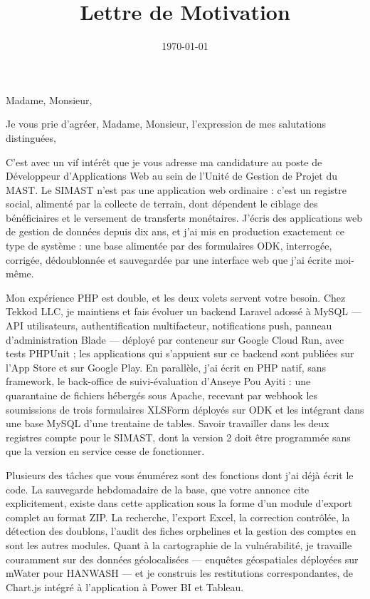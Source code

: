 \documentclass[10pt,a4paper,sans]{moderncv}
\title{Lettre de Motivation}
\begin{document}
\date{\today}
\opening{Madame, Monsieur,}
\closing{Je vous prie d'agréer, Madame, Monsieur, l'expression de mes salutations distinguées,}

\makelettertitle

C'est avec un vif intérêt que je vous adresse ma candidature au poste de Développeur d'Applications Web au sein de l'Unité de Gestion de Projet du MAST. Le SIMAST n'est pas une application web ordinaire : c'est un registre social, alimenté par la collecte de terrain, dont dépendent le ciblage des bénéficiaires et le versement de transferts monétaires. J'écris des applications web de gestion de données depuis dix ans, et j'ai mis en production exactement ce type de système : une base alimentée par des formulaires ODK, interrogée, corrigée, dédoublonnée et sauvegardée par une interface web que j'ai écrite moi-même.

Mon expérience PHP est double, et les deux volets servent votre besoin. Chez Tekkod LLC, je maintiens et fais évoluer un backend Laravel adossé à MySQL --- API utilisateurs, authentification multifacteur, notifications push, panneau d'administration Blade --- déployé par conteneur sur Google Cloud Run, avec tests PHPUnit ; les applications qui s'appuient sur ce backend sont publiées sur l'App Store et sur Google Play. En parallèle, j'ai écrit en PHP natif, sans framework, le back-office de suivi-évaluation d'Anseye Pou Ayiti : une quarantaine de fichiers hébergés sous Apache, recevant par webhook les soumissions de trois formulaires XLSForm déployés sur ODK et les intégrant dans une base MySQL d'une trentaine de tables. Savoir travailler dans les deux registres compte pour le SIMAST, dont la version 2 doit être programmée sans que la version en service cesse de fonctionner.

Plusieurs des tâches que vous énumérez sont des fonctions dont j'ai déjà écrit le code. La sauvegarde hebdomadaire de la base, que votre annonce cite explicitement, existe dans cette application sous la forme d'un module d'export complet au format ZIP. La recherche, l'export Excel, la correction contrôlée, la détection des doublons, l'audit des fiches orphelines et la gestion des comptes en sont les autres modules. Quant à la cartographie de la vulnérabilité, je travaille couramment sur des données géolocalisées --- enquêtes géospatiales déployées sur mWater pour HANWASH --- et je construis les restitutions correspondantes, de Chart.js intégré à l'application à Power BI et Tableau.
\end{document}
